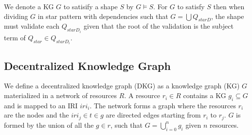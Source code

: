 We denote a KG $G$ to satisify a shape $S$ by $G \models S$.
For $G$ to satisfy $S$ then when dividing $G$ in star pattern with dependencies such that $G = \bigcup Q_{starD}$,
the shape must validate each $Q_{starD_i}$ given that the root of the validation is the subject term of $Q_{star} \in Q_{starD_i}$.

\subsection{Decentralized Knowledge Graph}
We define a decentralized knowledge graph (DKG) as a knowledge graph (KG) $G$ materialized in a network of resources $R$.
A resource $r_i \in R$ contains a KG $g_i \subseteq G$ and is mapped to an IRI $iri_i$.
The network forms a graph where the resources $r_i$ are the nodes and the $iri_j \in t \in g$ are directed edges starting from $r_i$ to $r_j$.
$G$ is formed by the union of all the $g \in r$, such that $G = \bigcup_{i=0}^{n}g_i$ given $n$ resources.